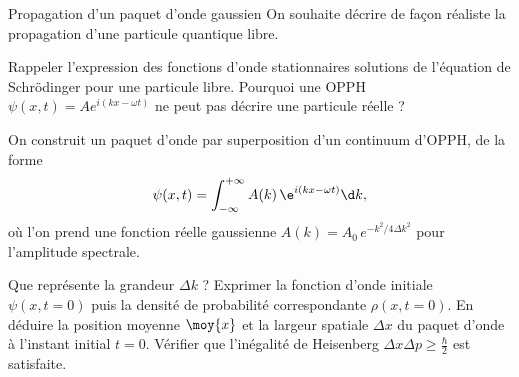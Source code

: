 \begin{exo}[PC][2]{Propagation d’un paquet d'onde gaussien}
  On souhaite décrire de façon réaliste la propagation d’une particule quantique libre.
\begin{quest}
\item Rappeler l'expression des fonctions d'onde stationnaires solutions de l'équation de Schrödinger pour une particule libre. Pourquoi une OPPH $\psi(x,t) = Ae^{i(kx-\omega t)}$ ne peut pas décrire une particule réelle ?
\end{quest}
On construit un paquet d’onde par superposition d’un continuum d’OPPH, de la forme 
\begin{equation*}
\psi(x,t)=\int_{-\infty}^{+\infty}A(k)\, \e^{i(k x - \omega t)}\d k,
\end{equation*}
où l’on prend une fonction réelle gaussienne
$A(k) = A_0 \, e^{-k^2/4\Delta k^2}$ pour l’amplitude spectrale.

\begin{quest}
\item Que représente la grandeur $\Delta k$ ?  Exprimer la fonction d'onde initiale $\psi(x,t=0)$ puis la densité de probabilité correspondante $\rho(x,t=0)$.
En déduire la position moyenne $\moy{x}$ et la largeur spatiale $\Delta x$ du paquet d’onde à l'instant initial $t=0$. Vérifier que l’inégalité de Heisenberg $\Delta x \Delta p \geq \frac{\hbar}{2}$ est satisfaite.
\sol{
  
}
\end{quest}
\end{exo}
